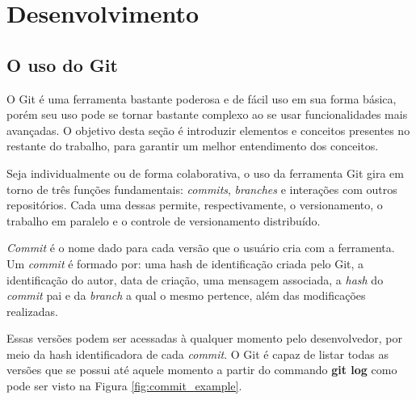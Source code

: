 \chapter{Desenvolvimento}
\label{chapter:desenvolvimento}



\section{O uso do Git}
\label{git_usage_section}

O Git é uma ferramenta bastante poderosa e de fácil uso em sua forma básica, porém seu uso pode se tornar bastante complexo ao se usar funcionalidades mais avançadas. O objetivo desta seção é introduzir elementos e conceitos presentes no restante do trabalho, para garantir um melhor entendimento dos conceitos.

Seja individualmente ou de forma colaborativa, o uso da ferramenta Git gira em torno de três funções fundamentais: \textit{commits}, \textit{branches} e interações com outros repositórios. Cada uma dessas permite, respectivamente, o versionamento, o trabalho em paralelo e o controle de versionamento distribuído.

\textit{Commit} é o nome dado para cada versão que o usuário cria com a ferramenta. Um \textit{commit} é formado por: uma hash de identificação criada pelo Git, a identificação do autor, data de criação, uma mensagem associada, a \textit{hash} do \textit{commit} pai e da \textit{branch} a qual o mesmo pertence, além das modificações realizadas. 

Essas versões podem ser acessadas à qualquer momento pelo desenvolvedor, por meio da hash identificadora de cada \textit{commit}. O Git é capaz de listar todas as versões que se possui até aquele momento a partir do commando \textbf{git log} como pode ser visto na Figura \ref{fig:commit_example}.

